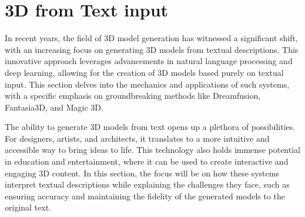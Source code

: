 \section{3D from Text input}\label{3d from text}

In recent years, the field of 3D model generation has witnessed a significant shift, with an increasing focus on generating 3D models from textual descriptions. This innovative approach leverages advancements in natural language processing and deep learning, allowing for the creation of 3D models based purely on textual input. This section delves into the mechanics and applications of such systems, with a specific emphasis on groundbreaking methods like Dreamfusion, Fantasia3D, and Magic 3D.

The ability to generate 3D models from text opens up a plethora of possibilities. For designers, artists, and architects, it translates to a more intuitive and accessible way to bring ideas to life. This technology also holds immense potential in education and entertainment, where it can be used to create interactive and engaging 3D content. In this section, the focus will be on how these systems interpret textual descriptions while explaining the challenges they face, such as ensuring accuracy and maintaining the fidelity of the generated models to the original text.

%



